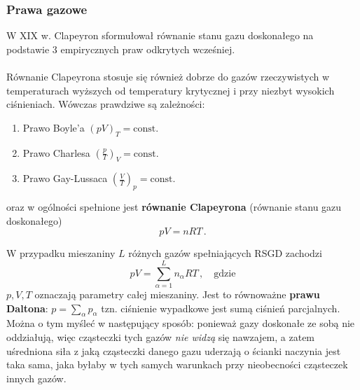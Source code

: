 \documentclass[../main.tex]{subfiles}
\begin{document}
\subsubsection{Prawa gazowe}
W XIX w. Clapeyron sformułował równanie stanu gazu doskonałego na podstawie 3 empirycznych praw odkrytych wcześniej.\\

\noindent{}\\

Równanie Clapeyrona stosuje się również dobrze do gazów rzeczywistych w temperaturach wyższych od temperatury krytycznej i przy niezbyt wysokich ciśnieniach. Wówczas prawdziwe są zależności:
\begin{enumerate}
    \item Prawo Boyle'a \((pV)_{T}=\text{const}\).
    \item Prawo Charlesa \(\left(\frac{p}{T}\right)_{V}=\text{const}\).
    \item Prawo Gay-Lussaca \(\left(\frac{V}{T}\right)_{p}=\text{const}\).
\end{enumerate}
oraz w ogólności spełnione jest \textbf{równanie Clapeyrona} (równanie stanu gazu doskonałego)
\begin{equation*}
    pV=nRT\,.
\end{equation*}

W przypadku mieszaniny \(L\) różnych gazów spełniających RSGD zachodzi
\begin{equation*}
    pV=\sum_{\alpha=1}^Ln_\alpha RT\,,\quad\text{gdzie}
\end{equation*}
\(p,V,T\) oznaczają parametry całej mieszaniny. Jest to równoważne \textbf{prawu Daltona}: \(p=\sum_\alpha p_\alpha\) tzn. ciśnienie wypadkowe jest sumą ciśnień parcjalnych. Można o tym myśleć w następujący sposób: ponieważ gazy doskonałe ze sobą nie oddziałują, więc cząsteczki tych gazów \textit{nie widzą} się nawzajem, a zatem uśredniona siła z jaką cząsteczki danego gazu uderzają o ścianki naczynia jest taka sama, jaka byłaby w tych samych warunkach przy nieobecności cząsteczek innych gazów.
\end{document}
